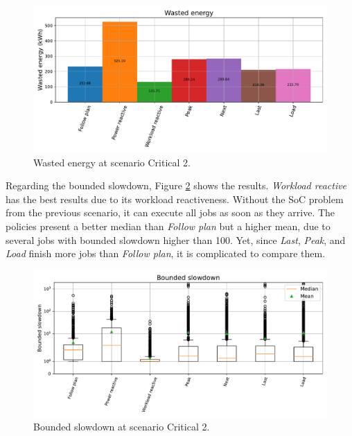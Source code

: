\begin{figure}[!htb]
    \centering
    \includegraphics[scale=0.55]{Images/Compensations/energy_critical_2.pdf}
    \caption{Wasted energy at scenario Critical 2.}
    \label{fig:energy_critical_2}
\end{figure}

Regarding the bounded slowdown, Figure \ref{fig:slowdown_critical_2} shows the results. \emph{Workload reactive} has the best results due to its workload reactiveness. Without the SoC problem from the previous scenario, it can execute all jobs as soon as they arrive. The policies present a better median than \emph{Follow plan} but a higher mean, due to several jobs with bounded slowdown higher than 100. Yet, since \emph{Last}, \emph{Peak}, and \emph{Load} finish more jobs than \emph{Follow plan}, it is complicated to compare them.

\begin{figure}[!htb]
    \centering
    \includegraphics[scale=0.55]{Images/Compensations/slowdown_critical_2.pdf}
    \caption{Bounded slowdown at scenario Critical 2.}
    \label{fig:slowdown_critical_2}
\end{figure}


